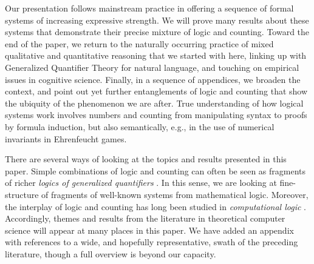 \documentclass[12pt,oneside,reqno]{amsart}
\theoremstyle{definition}
\begin{document}
Our presentation follows mainstream  practice in offering a sequence of formal systems of increasing expressive strength. We will prove many results about these systems that demonstrate their precise mixture of logic and counting. Toward the end of the paper, we return to the naturally occurring practice of mixed qualitative and quantitative reasoning that we started with here, linking up with Generalized Quantifier Theory for natural language, and touching on empirical issues in cognitive science. Finally, in a sequence of appendices, we broaden the context, and point out yet further entanglements of logic and counting that show the ubiquity of the phenomenon we are after. True understanding of how logical systems work involves numbers and counting from manipulating syntax to proofs by formula induction, but also semantically, e.g., in the use of numerical invariants in Ehrenfeucht games. 

\vspace{1ex}

There are several ways of looking at the topics and results presented in this paper. Simple combinations of logic and counting can often be seen as fragments of richer \emph{logics of generalized quantifiers} \citep{BarwiseFeferman,PetersWesterstahl}. In this sense, we are looking at  fine-structure of fragments of well-known systems from mathematical logic. Moreover, the interplay of logic and counting  has long been studied in  \emph{computational logic} \citep{Otto,Schweikardt}. Accordingly, themes and results from the literature in theoretical computer science will appear at many places in this paper. We have added an appendix with references to a wide, and hopefully representative, swath of the preceding literature, though a full overview is beyond our capacity.
\end{document}

